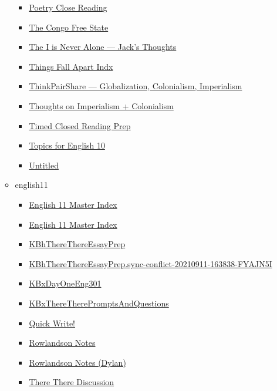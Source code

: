 \documentclass[11pt]{article}
\begin{document}
\begin{itemize}
\begin{itemize}
\begin{itemize}
\item \href{english/english10/KBhENG201PoetryCloseReadingAnalysis.org}{Poetry Close Reading}
\item \href{english/english10/KBhENG201CongoFreeState.org}{The Congo Free State}
\item \href{english/english10/KBhENG201TheIIsNeverAlone.org}{The I is Never Alone --- Jack's Thoughts}
\item \href{english/english10/KBhENG201ThingsFallApart.org}{Things Fall Apart Indx}
\item \href{english/english10/KBhENG201TPSGlobalizationColonialismImperialism.org}{ThinkPairShare --- Globalization, Colonialism, Imperialism}
\item \href{english/english10/KBhENG201ImperialismColonialism.org}{Thoughts on Imperialism + Colonialism}
\item \href{english/english10/KBhENG201CloseReadingTimed.org}{Timed Closed Reading Prep}
\item \href{english/english10/KBe2020eng201refEnglishTopics.org}{Topics for English 10}
\item \href{english/english10/Untitled.org}{Untitled}
\end{itemize}
\item english11
\begin{itemize}
\item \href{english/english11/KBMasterIndexEng301.org}{English 11 Master Index}
\item \href{english/english11/index.org}{English 11 Master Index}
\item \href{english/english11/KBhThereThereEssayPrep.org}{KBhThereThereEssayPrep}
\item \href{english/english11/KBhThereThereEssayPrep.sync-conflict-20210911-163838-FYAJN5I.org}{KBhThereThereEssayPrep.sync-conflict-20210911-163838-FYAJN5I}
\item \href{english/english11/KBxDayOneEng301.org}{KBxDayOneEng301}
\item \href{english/english11/KBxThereTherePromptsAndQuestions.org}{KBxThereTherePromptsAndQuestions}
\item \href{english/english11/KBxQuickWrite.org}{Quick Write!}
\item \href{english/english11/KBxRowlandson.org}{Rowlandson Notes}
\item \href{english/english11/KBdRowlandson.org}{Rowlandson Notes (Dylan)}
\item \href{english/english11/KBhENG301ThereThereDiscussion.org}{There There Discussion}

\end{itemize}
\end{itemize}
\end{itemize}
\end{document}
